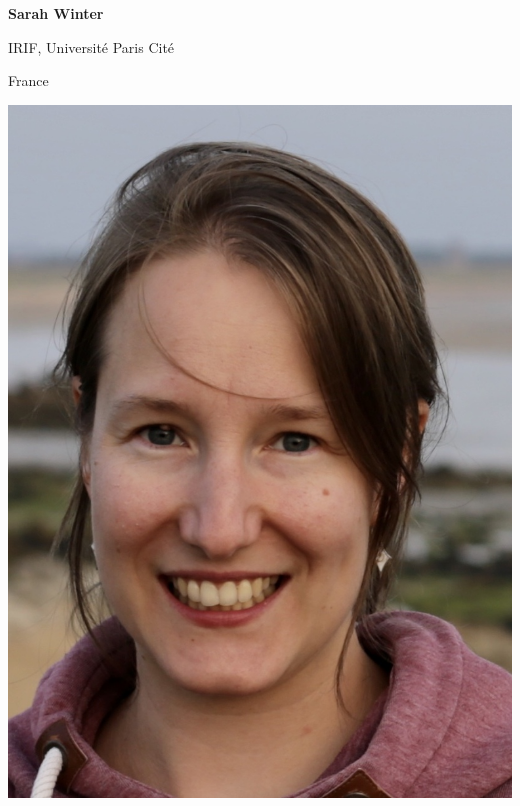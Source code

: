 \documentclass[a3paper, 12pt]{article}
\begin{document}
\begin{minipage}[t]{.43\linewidth}
  
  \begin{minipage}{.75\linewidth}
    \flushright%
    \textbf{Sarah Winter}

    IRIF, Université Paris Cité

    France
  \end{minipage}
  \hfill
  \begin{minipage}{.2\linewidth}
    \includegraphics[width=\linewidth, trim=0 0 0 0, clip]{winter}
  \end{minipage}

  \medskip

  

\end{minipage}
\end{document}
